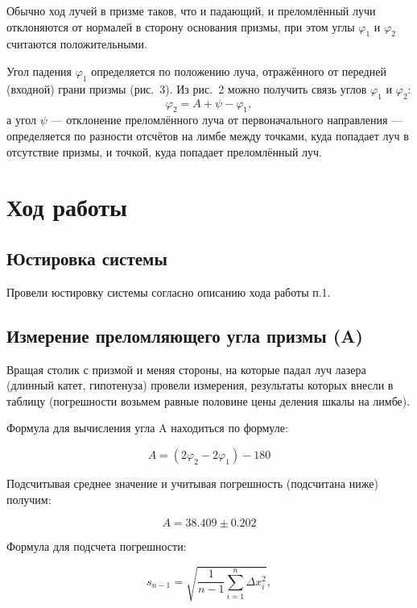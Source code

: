 \documentclass[a4paper]{article}
\begin{document}
Обычно ход лучей в призме таков, что и падающий, и преломлённый лучи отклоняются от нормалей в сторону основания призмы, при этом углы $\varphi_1$ и $\varphi_2$ считаются положительными.

Угол падения $\varphi_1$ определяется по положению луча, отражённого от передней (входной) грани призмы (рис.~3). Из рис.~2 можно получить связь углов $\varphi_1$ и $\varphi_2$:
\begin{equation}
\varphi_2 = A + \psi - \varphi_1,
\label{eq:angle_relation_prism}
\end{equation}
а угол $\psi$ — отклонение преломлённого луча от первоначального направления — определяется по разности отсчётов на лимбе между точками, куда попадает луч в отсутствие призмы, и точкой, куда попадает преломлённый луч.

\section{Ход работы}

\subsection{Юстировка системы}

Провели юстировку системы согласно описанию хода работы п.1.

\subsection{Измерение преломляющего угла призмы (A)}

Вращая столик с призмой и меняя стороны, на которые падал луч лазера (длинный катет, гипотенуза) провели измерения, результаты которых внесли в таблицу (погрешности возьмем равные половине цены деления шкалы на лимбе).

\par

Формула для вычисления угла A находиться по формуле:

\[ A = (2\varphi_2 - 2\varphi_1) -180 \]

Подсчитывая среднее значение и учитывая погрешность (подсчитана ниже) получим:

\[A = 38.409 \pm 0.202 \]

Формула для подсчета погрешности:

\begin{equation}
s_{n-1} = \sqrt{ \frac{1}{n-1} \sum_{i=1}^{n} \Delta x_i^2 },
\label{eq:sample_std_dev}
\end{equation}
\end{document}
